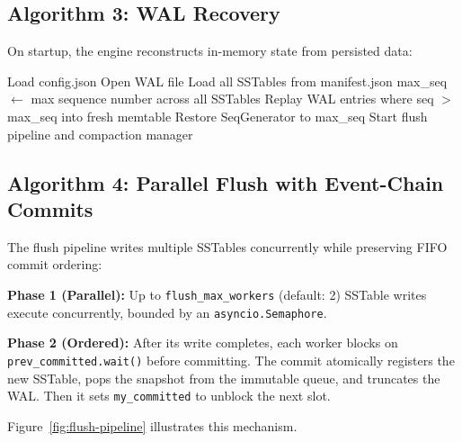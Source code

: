 \documentclass[oneside,a4paper,12pt]{book}
\begin{document}
\subsection{Algorithm 3: WAL Recovery}

On startup, the engine reconstructs in-memory state from persisted data:

\begin{algorithm}[H]
\caption{WAL Recovery}
\begin{algorithmic}[1]
\STATE Load config.json
\STATE Open WAL file
\STATE Load all SSTables from manifest.json
\STATE max\_seq $\leftarrow$ max sequence number across all SSTables
\STATE Replay WAL entries where seq $>$ max\_seq into fresh memtable
\STATE Restore SeqGenerator to max\_seq
\STATE Start flush pipeline and compaction manager
\end{algorithmic}
\end{algorithm}

\subsection{Algorithm 4: Parallel Flush with Event-Chain Commits}

The flush pipeline writes multiple SSTables concurrently while preserving FIFO commit ordering:

\textbf{Phase 1 (Parallel):} Up to \texttt{flush\_max\_workers} (default: 2) SSTable writes execute concurrently, bounded by an \texttt{asyncio.Semaphore}.

\textbf{Phase 2 (Ordered):} After its write completes, each worker blocks on \\ \texttt{prev\_committed.wait()} before committing. The commit atomically registers the new SSTable, pops the snapshot from the immutable queue, and truncates the WAL. Then it sets \texttt{my\_committed} to unblock the next slot.

Figure~\ref{fig:flush-pipeline} illustrates this mechanism.
\end{document}

